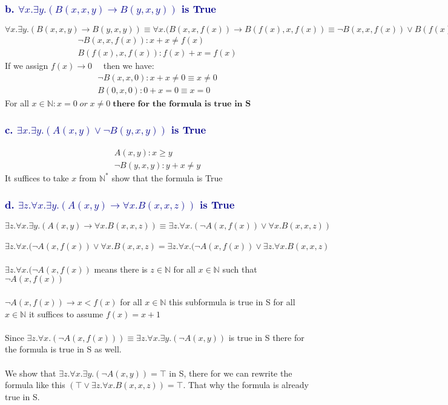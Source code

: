 \documentclass[12pt]{article}
\theoremstyle{definition}
\theoremstyle{plain}
\begin{document}
\subsubsection*{\textcolor{darkblue}{b. $\forall x. \exists y.(B(x,x,y) \rightarrow B(y,x,y))$ is True}}
$\forall x. \exists y.(B(x,x,y) \rightarrow B(y,x,y)) \equiv \forall x.(B(x,x,f(x)) \rightarrow B(f(x), x, f(x)) \equiv \neg B(x,x,f(x))  \vee B(f(x), x, f(x))$
\begin{align}
  \neg B(x,x,f(x)): x + x \neq f(x)\\
  B(f(x),x,f(x)): f(x) + x = f(x)
\end{align}
If we assign $f(x) \rightarrow 0\quad$ then we have:
\begin{align}
  \neg B(x,x,0): x + x \neq 0 \equiv x \neq 0\\
  B(0,x,0): 0 + x = 0 \equiv x = 0
\end{align}
For all $x \in \mathbb{N}: x = 0 \; or \;x \neq 0 \; \textbf{there for the formula is true in S}$ 

\subsubsection*{\textcolor{darkblue}{c. $\exists x. \exists y.(A(x,y) \vee \neg B(y,x,y))$ is True}}
\begin{align}
  A(x,y): x \geq y\\
  \neg B(y,x,y): y + x \neq y
\end{align}
It suffices to take $x$ from $\mathbb{N^*}$ show that the formula is True
\subsubsection*{\textcolor{darkblue}{d. $\exists z. \forall x. \exists y.(A(x,y) \rightarrow \forall x.B(x,x,z))$ is True}}
$\exists z. \forall x. \exists y.(A(x,y) \rightarrow \forall x.B(x,x,z)) \equiv \exists z. \forall x.(\neg A(x,f(x)) \vee \forall x.B(x,x,z))$\\\\
$\exists z. \forall x.(\neg A(x,f(x)) \vee \forall x.B(x,x,z) = \exists z. \forall x.(\neg A(x, f(x)) \vee \exists z. \forall x.B(x,x,z)$\\\\

$\exists z. \forall x.(\neg A(x, f(x))$  means there is $z \in \mathbb{N}$ for all $x \in \mathbb{N}$ such that $\neg A(x, f(x))$\\\\
$\neg A(x, f(x)) \rightarrow x < f(x)$ for all $x \in \mathbb{N}$ this subformula is true in S for all $x \in \mathbb{N}$ it suffices to assume $f(x) = x + 1$\\\\
Since $\exists z. \forall x.(\neg A(x, f(x))) \equiv \exists z. \forall x. \exists y.(\neg A(x,y))$ is true in S there for the formula is true in S as well.\\\\
We show that $\exists z. \forall x. \exists y.(\neg A(x,y)) = \top$ in S, there for we can rewrite the formula like this $ (\top \vee \exists z. \forall x.B(x,x,z)) = \top$. That why the formula is already true in S.\\
\end{document}
